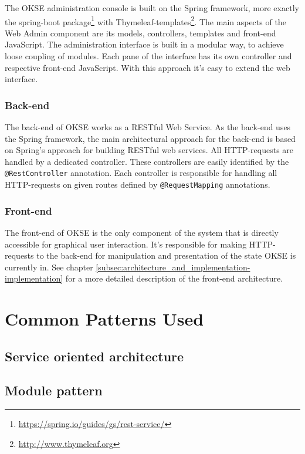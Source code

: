 The OKSE administration console is built on the Spring framework, more exactly the spring-boot package\footnote{\url{https://spring.io/guides/gs/rest-service/}} with Thymeleaf-templates\footnote{\url{http://www.thymeleaf.org}}. The main aspects of the Web Admin component are its models, controllers, templates and front-end JavaScript. The administration interface is built in a modular way, to achieve loose coupling of modules. Each pane of the interface has its own controller and respective front-end JavaScript.  With this approach it's easy to extend the web interface.

\subsubsection{Back-end}

The back-end of OKSE works as a RESTful Web Service. As the back-end uses the Spring framework, the main architectural approach for the back-end is based on Spring’s approach for building RESTful web services. All HTTP-requests are handled by a dedicated controller. These controllers are easily identified by the \verb!@RestController! annotation. Each controller is responsible for handling all HTTP-requests on given routes defined by \verb!@RequestMapping! annotations.  

\subsubsection{Front-end}

The front-end of OKSE is the only component of the system that is directly accessible for graphical user interaction. It's responsible for making HTTP-requests to the back-end for manipulation and presentation of the state OKSE is currently in. See chapter \ref{subsec:architecture_and_implementation-implementation} for a more detailed description of the front-end architecture.

\section{Common Patterns Used}
\label{sec:common-patterns-used}

\subsection{Service oriented architecture}

\subsection{Module pattern}

